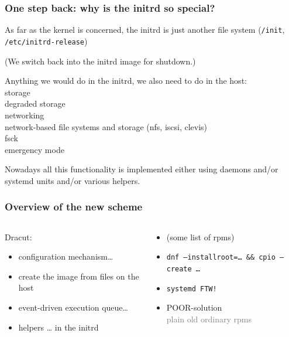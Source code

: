 \documentclass[]{beamer}
\begin{document}
\begin{frame}
  \frametitle{One step back: why is the initrd so special?}

  As far as the kernel is concerned, the initrd is just another file system
  (\texttt{/init}, \texttt{/etc/initrd-release})\\

  \pause

  (We switch back into the initrd image for shutdown.)\\

  \pause

  Anything we would do in the initrd, we also need to do in the host:\\
  storage\\
  degraded storage\\
  networking\\
  network-based file systems and storage (nfs, iscsi, clevis)\\
  fsck\\
  emergency mode\\

  \pause

  Nowadays all this functionality is implemented either using daemons
  and/or systemd units and/or various helpers.
\end{frame}

\begin{frame}
  \frametitle{Overview of the new scheme}

  \begin{columns}
    \begin{column}[t]{0.5\textwidth}
      Dracut:
      \begin{itemize}
      \item configuration mechanism…
      \item create the image from files on the host
      \item event-driven execution queue…
      \item helpers … in the initrd
      \end{itemize}
    \end{column}         %
    \pause

    \begin{column}[t]{0.5\textwidth}
      \begin{itemize}
      \item (some list of rpms)
        \pause
      \item \texttt{dnf --installroot=… \&\& cpio --create …}
        \pause
      \item \texttt{systemd FTW!\\\phantom{x}}
        \pause
      \item POOR-solution\\\pause
        \textcolor{gray}{plain old ordinary rpms}
      \end{itemize}
    \end{column}
  \end{columns}
\end{frame}
\end{document}
